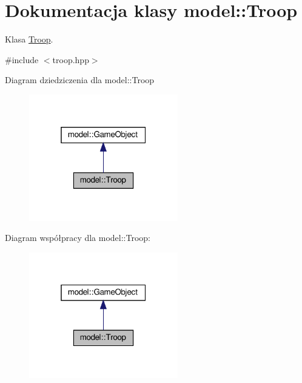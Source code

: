 \hypertarget{classmodel_1_1Troop}{}\section{Dokumentacja klasy model\+:\+:Troop}
\label{classmodel_1_1Troop}


Klasa \hyperlink{classmodel_1_1Troop}{Troop}.  




{\ttfamily \#include $<$troop.\+hpp$>$}



Diagram dziedziczenia dla model\+:\+:Troop\nopagebreak
\begin{figure}[H]
\begin{center}
\leavevmode
\includegraphics[width=184pt]{classmodel_1_1Troop__inherit__graph}
\end{center}
\end{figure}


Diagram współpracy dla model\+:\+:Troop\+:\nopagebreak
\begin{figure}[H]
\begin{center}
\leavevmode
\includegraphics[width=184pt]{classmodel_1_1Troop__coll__graph}
\end{center}
\end{figure}
